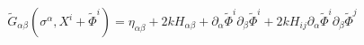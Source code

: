 \begin{equation}
\tilde G_{\alpha\beta}(\sigma^\alpha,X^i+\tilde\Phi^i)=\eta_{\alpha\beta}+2kH_{\alpha\beta}+
  \partial_\alpha\tilde\Phi^i\partial_\beta\tilde\Phi^i+
  2kH_{i j}\partial_\alpha\tilde\Phi^i\partial_\beta\tilde\Phi^j
\end{equation}

